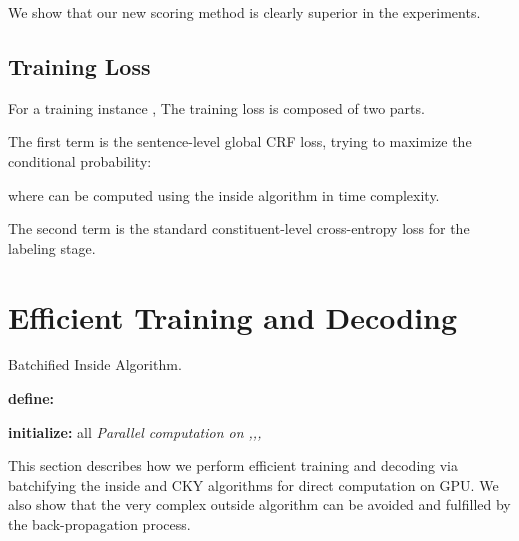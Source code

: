 \documentclass{article}
\begin{document}
We show that our new scoring method is clearly superior in the experiments.


\subsection{Training Loss}

For a training instance , The training loss is composed of two parts.

The first term is the sentence-level global CRF loss, trying to maximize the conditional probability:

where  can be computed using the inside algorithm in  time complexity.

The second term is the standard constituent-level cross-entropy loss for the labeling stage.








 
\section{Efficient Training and Decoding}
\label{section:efficient-training-decoding}

\begin{algorithm}[tb]
\caption{Batchified Inside Algorithm.}
\begin{algorithmic}[1]
\newlength{\commentindent}
\setlength{\commentindent}{.2\textwidth}
\renewcommand{\algorithmiccomment}[1]{\unskip\hfill\makebox[\commentindent][l]{~#1}\par}
\LetLtxMacro{\oldalgorithmic}{\algorithmic}
\renewcommand{\algorithmic}[1][0]{\oldalgorithmic[#1]\renewcommand{\ALC@com}[1]{\ifnum\pdfstrcmp{##1}{default}=0\else\algorithmiccomment{##1}\fi}}
\STATE \textbf{define:}  


\STATE \textbf{initialize:} all 
\STATE \emph{Parallel computation on ,,,}
\STATE  \label{line:sum-product}\\
\ENDFOR
\RETURN 
\end{algorithmic}
\label{alg:inside}
\end{algorithm}
 
This section describes how we perform efficient training and decoding via batchifying the inside and CKY algorithms for direct computation on GPU. We also show that the very complex outside algorithm can be avoided and fulfilled by the back-propagation process.
\end{document}
